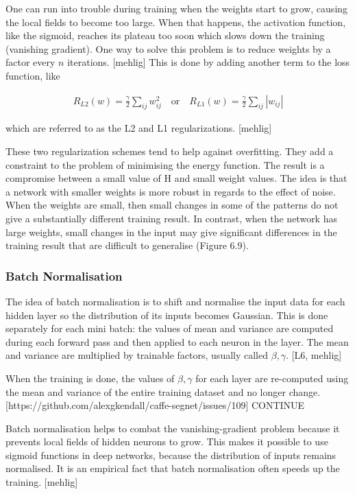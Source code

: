 One can run into trouble during training when the weights start to grow, causing the local fields to become too large. When that happens, the activation function, like the sigmoid, reaches its plateau too soon which slows down the training (vanishing gradient). One way to solve this problem is to reduce weights by a factor every $ n $ iterations. [mehlig] This is done by adding another term to the loss function, like

\begin{gather}
	R_{L2}(w) = \frac{\gamma}{2} \sum\limits_{ij} w_{ij}^{2} \quad \text{or} \quad R_{L1}(w) = \frac{\gamma}{2} \sum\limits_{ij} |w_{ij}|
\end{gather}

\noindent which are referred to as the L2 and L1 regularizations. [mehlig]

These two regularization schemes tend to help against overfitting. They add a constraint to the problem of minimising the energy function. The result is a compromise between a small value of H and small weight values. The idea is that a network with smaller weights is more robust in regards to the effect of noise. When the weights are small, then small changes in some of the
patterns do not give a substantially different training result. In contrast, when the network has large weights, small changes in the input may give significant differences in the training result that are difficult to generalise (Figure 6.9).

\subsubsection{Batch Normalisation}

The idea of batch normalisation is to shift and normalise the input data for each
hidden layer so the distribution of its inputs becomes Gaussian. This is done separately for
each mini batch: the values of mean and variance are computed during each forward pass and then applied to each neuron in the layer. The mean and variance are multiplied by trainable factors, usually called $ \beta, \gamma $. [L6, mehlig]

When the training is done, the values of $ \beta, \gamma $ for each layer are re-computed using the mean and variance of the entire training dataset and no longer change. [https://github.com/alexgkendall/caffe-segnet/issues/109] CONTINUE

Batch normalisation helps to combat the vanishing-gradient problem because it prevents local fields of hidden neurons to grow. This makes it possible to use sigmoid functions in deep networks, because the distribution of inputs remains normalised. It is an empirical fact that batch normalisation often speeds up the training. [mehlig]


